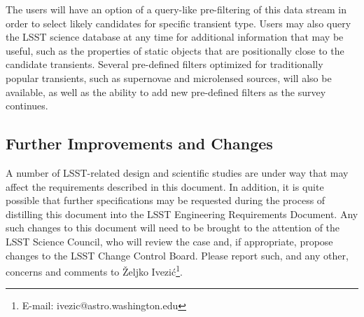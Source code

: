 The users
will have an option of a query-like pre-filtering of this data stream
in order to select likely candidates for specific transient type. Users
may also query the LSST science database at any time for additional
information that may be useful, such as the properties of static objects
that are positionally close to the candidate transients.
Several pre-defined filters optimized for traditionally popular transients,
such as supernovae and microlensed sources, will also be available,
as well as the ability to add new pre-defined filters as the survey
continues.


\subsection{Further Improvements and Changes}

A number of LSST-related design and scientific studies are under way that
may affect the requirements described in this document. In addition, it is
quite possible that further specifications may be requested during the
process of distilling this document into the LSST Engineering Requirements
Document. Any such changes to this document will need to be brought to the
attention of the LSST Science Council, who will review the case and, if
appropriate, propose changes to the LSST Change Control Board. Please report
such, and any other, concerns and comments to \v{Z}eljko
Ivezi\'{c}\footnote{E-mail: ivezic@astro.washington.edu}.

